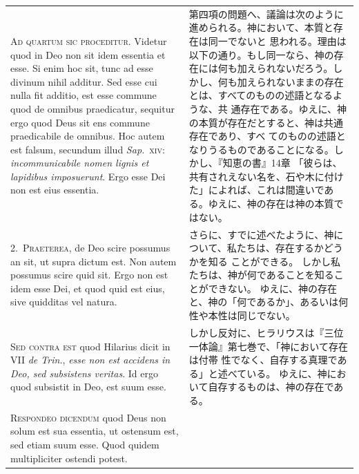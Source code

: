 \documentclass[paper=a4paper,fontsize=10pt,jafontsize=9pt,titlepage]{jlreq}
\begin{document}
\begin{longtable}{p{21em}p{21em}}

{\huge A}\textsc{d quartum sic proceditur}. Videtur quod in Deo non sit
 idem essentia et esse.  Si enim hoc sit, tunc ad esse divinum nihil
 additur.  Sed esse cui nulla fit additio, est esse commune quod de
 omnibus praedicatur, sequitur ergo quod Deus sit ens commune
 praedicabile de omnibus.  Hoc autem est falsum, secundum illud
 \textit{Sap.}~\textsc{xiv}: \textit{incommunicabile nomen lignis et
 lapidibus imposuerunt}.  Ergo esse Dei non est eius essentia.

&


第四項の問題へ、議論は次のように進められる。神において、本質と存在は同一でないと
 思われる。理由は以下の通り。もし同一なら、神の存在には何も加えられないだろう。し
 かし、何も加えられないままの存在とは、すべてのものの述語となるような、共
 通存在である。ゆえに、神の本質が存在だとすると、神は共通存在であり、すべ
 てのものの述語となりうるものであることになる。しかし、『知恵の書』14章
 「彼らは、共有されえない名を、石や木に付けた」によれば、これは間違いであ
 る。ゆえに、神の存在は神の本質ではない。

\\


2.~\textsc{Praeterea}, de Deo scire possumus an sit, ut supra dictum est.
Non autem possumus scire quid sit.
Ergo non est idem esse Dei, et quod quid est eius, sive quidditas vel
 natura.

&

さらに、すでに述べたように、神について、私たちは、存在するかどうかを知る
 ことができる。
しかし私たちは、神が何であることを知ることができない。
ゆえに、神の存在と、神の「何であるか」、あるいは何性や本性は同じでない。

\\

\textsc{Sed contra est} quod Hilarius dicit in VII \textit{de Trin.}, \textit{esse non est accidens in Deo, sed subsistens veritas}. 
Id ergo quod subsistit in Deo, est suum esse.

&
しかし反対に、ヒラリウスは『三位一体論』第七巻で、「神において存在は付帯
 性でなく、自存する真理である」と述べている。
ゆえに、神において自存するものは、神の存在である。

\\

\textsc{Respondeo dicendum} quod Deus non solum est sua essentia, ut
 ostensum est, sed etiam suum esse.  Quod quidem multipliciter ostendi
 potest.  


\end{longtable}
\end{document}
